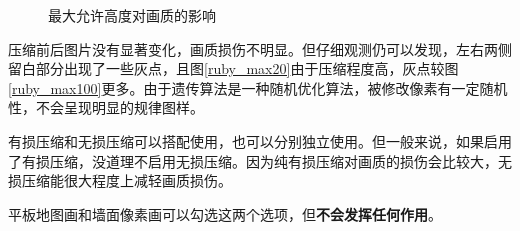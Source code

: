 \documentclass[UTF8]{ctexart}
\begin{document}
    \begin{figure}[htbp]
        \centering
        \caption{最大允许高度对画质的影响}
    \end{figure}

    压缩前后图片没有显著变化，画质损伤不明显。但仔细观测仍可以发现，左右两侧留白部分出现了一些灰点，且图\ref*{ruby_max20}由于压缩程度高，灰点较图\ref*{ruby_max100}更多。由于遗传算法是一种随机优化算法，被修改像素有一定随机性，不会呈现明显的规律图样。

    有损压缩和无损压缩可以搭配使用，也可以分别独立使用。但一般来说，如果启用了有损压缩，没道理不启用无损压缩。因为纯有损压缩对画质的损伤会比较大，无损压缩能很大程度上减轻画质损伤。
    
    平板地图画和墙面像素画可以勾选这两个选项，但\textbf{不会发挥任何作用}。
\end{document}
